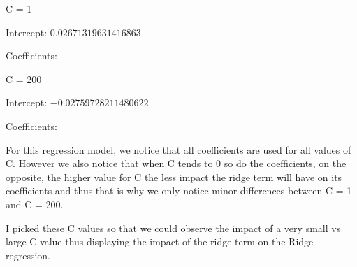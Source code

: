 \documentclass[10pt]{article}
\begin{document}
\vspace{5mm} %

C = 1
\par
Intercept: $0.02671319631416863$
\par
Coefficients:
\begin{equation*}
    [0, 0.00897235, 0.93984335, 0.70409046, -0.05097339, 0.16709087
\end{equation*}
\begin{equation*}
    0.1100758, 0.09688451, -0.19635685, 0.07396169, 0.30812562, -0.04912464
\end{equation*}
\begin{equation*}
    -0.02268318, 0.05130517, -0.108326, -0.14242707, 0.06966072, 0.12227828
\end{equation*}
\begin{equation*}
    -0.16703029, 0.08436703, -0.04872375]
\end{equation*}

\vspace{5mm} %

C = 200
\par
Intercept: $-0.02759728211480622$
\par
Coefficients:
\begin{equation*}
    [ 0, -0.00662543, 0.99248296, 0.89984203, -0.14267824, 0.3603547
\end{equation*}
\begin{equation*}
    0.57425937, 0.07124828, -0.79767503, 0.00522424, 0.1531058, 0.01859584
\end{equation*}
\begin{equation*}
    -0.20079551, 0.17207762, -0.2688553, -0.65605953, 0.27619337, 0.37207688
\end{equation*}
\begin{equation*}
    -0.45549789, 0.64632594, -0.00373098]
\end{equation*}


For this regression model, we notice that all coefficients are used for all values of C. However we also
notice that when C tends to 0 so do the coefficients, on the opposite, the higher value for C the less impact
the ridge term will have on its coefficients and thus that is why we only notice minor differences between C = 1 and C = 200.

I picked these C values so that we could observe the impact of a very small vs large C value thus 
displaying the impact of the ridge term on the Ridge regression.
\end{document}
